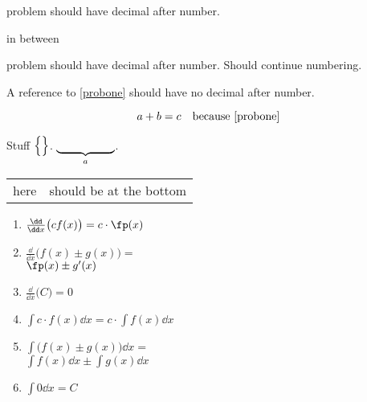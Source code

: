 \documentclass[10pt]{book}
\begin{document}
\begin{sectionexercises}
\item\label{probone} problem should have decimal after number.
\end{sectionexercises}
in between
\begin{sectionexercises}
\item problem should have decimal after number.  Should continue numbering.
\end{sectionexercises}

A reference to \ref{probone} should have no decimal after number.

\[a+b=c\quad\text{because \ref{probone}}\]

Stuff $\left\{\rule{0pt}{12pt}\right\}$.  $\underbrace{\makebox[1.8cm]{}}_a$.

\begin{tabular}{cc}
here & \multirow{1.5}{*}{should be at the bottom}
\end{tabular}

\parbox[t]{\linewidth}{\begin{multicols}{2}
\begin{enumerate}
\item\label{thm:d_const_mult_rule} $\frac{\dd}{\dd x}\bigl(cf(x) \bigr) = c\cdot \fp(x)$
\item\label{thm:d_sum_diff_rule} $\frac{\dd}{\dd x}\bigl(f(x)\pm g(x) \bigr) =$ \\
\null\qquad$\fp(x)\pm g'(x)$
\item $\frac{\dd}{\dd x}\bigl(C \bigr) = 0$
\setcounter{enumi}{0}
\item $\int c\cdot f(x)\dd x = c\cdot \int f(x)\dd x$
\item $\int \bigl(f(x)\pm g(x)\bigr)\dd x =$ \\
\null\qquad$\int f(x)\dd x\pm \int g(x)\dd x$
\item $\int 0\dd x = C$
\end{enumerate}
\end{multicols}}
\end{document}
